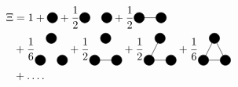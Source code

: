 \documentclass[8.5pt,twoside,twocolumn]{article}
\theoremstyle{standard}
\begin{document}
\begin{equation}
\begin{aligned}
\Xi&=1+
\begin{tikzpicture}[baseline={([yshift=-.3em]current bounding box.center)}]
  \draw(0,0) node[circle,minimum size=.2cm,draw,fill=black] (A) {};
\end{tikzpicture}
+
\frac 1 2
\begin{tikzpicture}[baseline={([yshift=-.3em]current bounding box.center)}]
  \draw(0,0) node[circle,minimum size=.2cm,draw,fill=black] (A) {};
  \draw(.7,0) node[circle,minimum size=.2cm,draw,fill=black] (B) {};
\end{tikzpicture}
+
\frac 1 2
\begin{tikzpicture}[baseline={([yshift=-.3em]current bounding box.center)}]
  \draw(0,0) node[circle,minimum size=.2cm,draw,fill=black] (A) {};
  \draw(.7,0) node[circle,minimum size=.2cm,draw,fill=black] (B) {};
  \draw (A.center) --  (B.center);
\end{tikzpicture}
\\
&+\frac 1 6
\begin{tikzpicture}[baseline={([yshift=-.3em]current bounding box.center)}]
  \draw(0,0) node[circle,minimum size=.2cm,draw,fill=black] (A) {};
  \draw(.7,0) node[circle,minimum size=.2cm,draw,fill=black] (B) {};
  \draw(.35,.7) node[circle,minimum size=.2cm,draw,fill=black] (C) {};
\end{tikzpicture}
+\frac 1 2
\begin{tikzpicture}[baseline={([yshift=-.3em]current bounding box.center)}]
  \draw(0,0) node[circle,minimum size=.2cm,draw,fill=black] (A) {};
  \draw(.7,0) node[circle,minimum size=.2cm,draw,fill=black] (B) {};
  \draw(.35,.7) node[circle,minimum size=.2cm,draw,fill=black] (C) {};
  \draw (A.center) --  (B.center);
\end{tikzpicture}
+\frac 1 2
\begin{tikzpicture}[baseline={([yshift=-.3em]current bounding box.center)}]
  \draw(0,0) node[circle,minimum size=.2cm,draw,fill=black] (A) {};
  \draw(.7,0) node[circle,minimum size=.2cm,draw,fill=black] (B) {};
  \draw(.35,.7) node[circle,minimum size=.2cm,draw,fill=black] (C) {};
  \draw (A.center) --  (B.center);
  \draw (A.center) --  (C.center);
\end{tikzpicture}
+ \frac 1 6
\begin{tikzpicture}[baseline={([yshift=-.3em]current bounding box.center)}]
  \draw(0,0) node[circle,minimum size=.2cm,draw,fill=black] (A) {};
  \draw(.7,0) node[circle,minimum size=.2cm,draw,fill=black] (B) {};
  \draw(.35,.7) node[circle,minimum size=.2cm,draw,fill=black] (C) {};
  \draw (A.center) --  (B.center);
  \draw (A.center) --  (C.center);
  \draw (B.center) --  (C.center);
\end{tikzpicture}
\\
&+ \ldots .
\end{aligned}
\label{Grand:long}
\end{equation}
\end{document}
